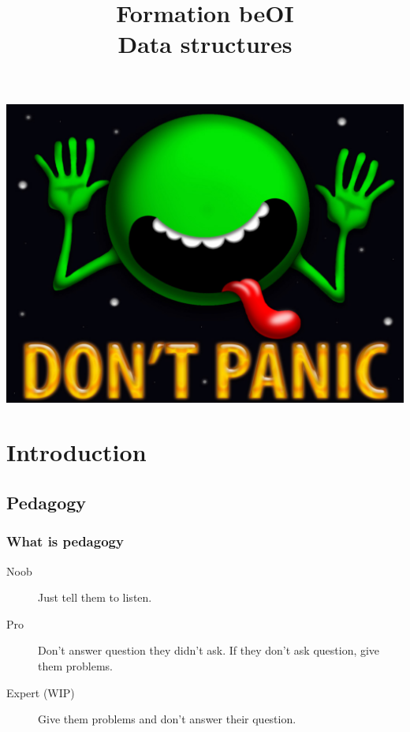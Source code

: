 \documentclass[10pt,svgnames,usenames,table]{beamer} %
\institute{beOI}
\title{\textbf{Formation beOI}\\Data structures}
\author{\and Benoît \textsc{Legat}}
\begin{document}
\begin{landscape}
\begin{frame}
	\vspace{-.5cm}
	\hspace*{.1mm}
	\includegraphics[page=1,width=\paperheight]{dontpanic.jpg}
\end{frame}
\end{landscape}

\begin{frame}
\maketitle
\end{frame}


\section{Introduction}
\subsection{Pedagogy}
\begin{frame}
\frametitle{What is pedagogy}

\begin{description}
  \item[Noob] Just tell them to listen.
    \vspace{0.5cm}
  \item[Pro] Don't answer question they didn't ask. If they don't ask question, give them problems.
    \vspace{0.5cm}
  \item[Expert (WIP)] Give them problems and don't answer their question.
\end{description}
\end{frame}
\end{document}
